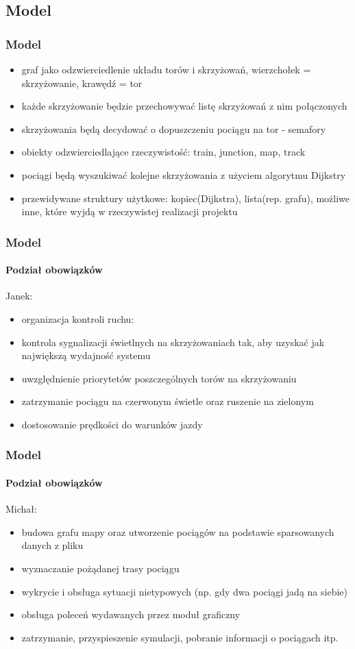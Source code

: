 \documentclass[a4paper, 11pt]{beamer}
\begin{document}
\subsection{Model}
\begin{frame}
\frametitle{Model}
\begin{itemize}
\item graf jako odzwierciedlenie układu torów i skrzyżowań, wierzchołek = skrzyżowanie, krawędź = tor
\item każde skrzyżowanie będzie przechowywać listę skrzyżowań z nim połączonych
\item skrzyżowania będą decydować o dopuszczeniu pociągu na tor - semafory
\item obiekty odzwierciedlające rzeczywistość: train, junction, map, track
\item pociągi będą wyszukiwać kolejne skrzyżowania z użyciem algorytmu Dijkstry
\item przewidywane struktury użytkowe: kopiec(Dijkstra), lista(rep. grafu), możliwe inne, które wyjdą w rzeczywistej realizacji projektu
\end{itemize}
\end{frame}
\begin{frame}
\frametitle{Model}
\framesubtitle{Podział obowiązków}
Janek: 
\begin{itemize}
\item organizacja kontroli ruchu:
\item kontrola sygnalizacji świetlnych na skrzyżowaniach tak, aby uzyskać jak największą wydajność systemu 
\item uwzględnienie priorytetów poszczególnych torów na skrzyżowaniu 
\item zatrzymanie pociągu na czerwonym świetle oraz ruszenie na zielonym 
\item dostosowanie prędkości do warunków jazdy 
\end{itemize}
\end{frame}
\begin{frame}
\frametitle{Model}
\framesubtitle{Podział obowiązków}
Michał: 
\begin{itemize}
\item budowa grafu mapy oraz utworzenie pociągów na podstawie sparsowanych danych z pliku
\item wyznaczanie pożądanej trasy pociągu
\item wykrycie i obsługa sytuacji nietypowych (np. gdy dwa pociągi jadą na siebie)
\item obsługa poleceń wydawanych przez moduł graficzny 
\item zatrzymanie, przyspieszenie symulacji, pobranie informacji o pociągach itp.
\end{itemize}
\end{frame}
\end{document}
